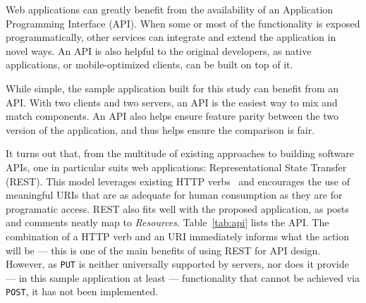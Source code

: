 Web applications can greatly benefit from the availability of an Application Programming Interface (API). When some or most of the functionality is exposed programmatically, other services can integrate and extend the application in novel ways. An API is also helpful to the original developers, as native applications, or mobile-optimized clients, can be built on top of it.

While simple, the sample application built for this study can benefit from an API. With two clients and two servers, an API is the easiest way to mix and match components. An API also helps ensure feature parity between the two version of the application, and thus helps ensure the comparison is fair.

It turns out that, from the multitude of existing approaches to building software APIs, one in particular suits web applications: Representational State Transfer~\cite{restful} (REST). This model leverages existing HTTP verbs~\cite{rfc2616} and encourages the use of meaningful URIs that are as adequate for human consumption as they are for programatic access. REST also fits well with the proposed application, as posts and comments neatly map to \emph{Resources}. Table~\ref{tab:api} lists the API. The combination of a HTTP verb and an URI immediately informs what the action will be --- this is one of the main benefits of using REST for API design. However, as \texttt{PUT} is neither universally supported by servers, nor does it provide --- in this sample application at least --- functionality that cannot be achieved via \texttt{POST}, it has not been implemented.

